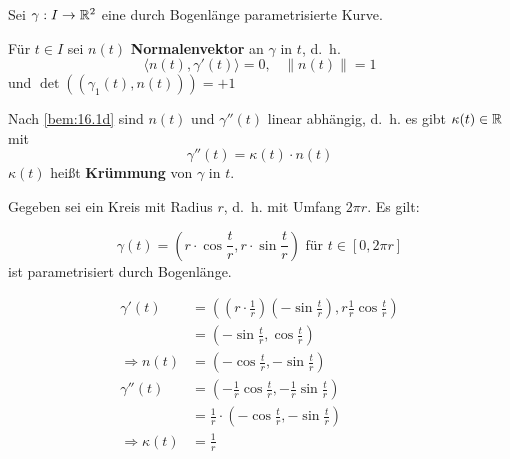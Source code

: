 \begin{definition}%
    Sei $\gamma: I \rightarrow \mathbb{R}^2$ eine durch Bogenlänge
    parametrisierte Kurve.

    \begin{defenum}
        \item Für $t \in I$ sei $n(t)$ \textbf{Normalenvektor}
              an $\gamma$ in $t$, d.~h.
              \[\langle n(t), \gamma'(t) \rangle = 0, \;\;\; \|n(t)\|=1 \]
              und $\det((\gamma_1(t), n(t))) = +1$
        \item Nach \cref{bem:16.1d} sind $n(t)$ und $\gamma''(t)$ linear
              abhängig, d.~h. es gibt $\kappa(t) \in \mathbb{R}$ mit
              \[\gamma''(t) = \kappa(t) \cdot n(t)\]
              $\kappa(t)$ heißt \textbf{Krümmung}
              von $\gamma$ in $t$.
    \end{defenum}
\end{definition}

\begin{beispiel}%
    Gegeben sei ein Kreis mit Radius $r$, d.~h. mit Umfang $2\pi r$.
    Es gilt:

    \[\gamma(t) = \left (r \cdot \cos \frac{t}{r}, r \cdot \sin \frac{t}{r} \right ) \text{ für } t \in [0, 2\pi r]\]
    ist parametrisiert durch Bogenlänge.

    \begin{align*}
        \gamma'(t)  &= \left ((r \cdot \frac{1}{r}) (- \sin \frac{t}{r}), r \frac{1}{r} \cos \frac{t}{r} \right )\\
                    &= \left (- \sin \frac{t}{r}, \cos \frac{t}{r} \right )\\
        \Rightarrow n(t) &= \left (- \cos \frac{t}{r}, - \sin \frac{t}{r} \right )\\
        \gamma''(t) &= \left (- \frac{1}{r} \cos \frac{t}{r}, - \frac{1}{r} \sin \frac{t}{r} \right )\\
                    &= \frac{1}{r} \cdot \left (- \cos \frac{t}{r}, - \sin \frac{t}{r} \right )\\
        \Rightarrow \kappa(t) &= \frac{1}{r}
    \end{align*}
\end{beispiel}

